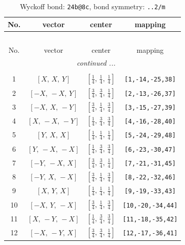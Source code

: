 \documentclass[fleqn,8pt]{jsarticle}
\begin{document}
\renewcommand{\arraystretch}{1.2}
\begin{longtable}{cccc}
\caption{Wyckoff bond: {\tt 24b@8c}, bond symmetry: {\tt ..2/m}}
 \\
 \hline \hline
No. & vector & center & mapping \\ \hline \endfirsthead

\multicolumn{3}{l}{\tablename\ \thetable{}} \\
 \hline \hline
No. & vector & center & mapping \\ \hline \endhead

 \hline \hline
\multicolumn{3}{r}{\footnotesize\it continued ...} \\ \endfoot

 \hline \hline
\multicolumn{3}{r}{} \\ \endlastfoot

1 & $\left[ X,\, X,\, Y \right]$ & $\left[ \frac{1}{4},\, \frac{1}{4},\, \frac{1}{4} \right]$ & {\tt [1,-14,-25,38]} \\ \hline
2 & $\left[ - X,\, - X,\, Y \right]$ & $\left[ \frac{3}{4},\, \frac{3}{4},\, \frac{1}{4} \right]$ & {\tt [2,-13,-26,37]} \\ \hline
3 & $\left[ - X,\, X,\, - Y \right]$ & $\left[ \frac{3}{4},\, \frac{1}{4},\, \frac{3}{4} \right]$ & {\tt [3,-15,-27,39]} \\ \hline
4 & $\left[ X,\, - X,\, - Y \right]$ & $\left[ \frac{1}{4},\, \frac{3}{4},\, \frac{3}{4} \right]$ & {\tt [4,-16,-28,40]} \\ \hline
5 & $\left[ Y,\, X,\, X \right]$ & $\left[ \frac{1}{4},\, \frac{1}{4},\, \frac{1}{4} \right]$ & {\tt [5,-24,-29,48]} \\ \hline
6 & $\left[ Y,\, - X,\, - X \right]$ & $\left[ \frac{1}{4},\, \frac{3}{4},\, \frac{3}{4} \right]$ & {\tt [6,-23,-30,47]} \\ \hline
7 & $\left[ - Y,\, - X,\, X \right]$ & $\left[ \frac{3}{4},\, \frac{3}{4},\, \frac{1}{4} \right]$ & {\tt [7,-21,-31,45]} \\ \hline
8 & $\left[ - Y,\, X,\, - X \right]$ & $\left[ \frac{3}{4},\, \frac{1}{4},\, \frac{3}{4} \right]$ & {\tt [8,-22,-32,46]} \\ \hline
9 & $\left[ X,\, Y,\, X \right]$ & $\left[ \frac{1}{4},\, \frac{1}{4},\, \frac{1}{4} \right]$ & {\tt [9,-19,-33,43]} \\ \hline
10 & $\left[ - X,\, Y,\, - X \right]$ & $\left[ \frac{3}{4},\, \frac{1}{4},\, \frac{3}{4} \right]$ & {\tt [10,-20,-34,44]} \\ \hline
11 & $\left[ X,\, - Y,\, - X \right]$ & $\left[ \frac{1}{4},\, \frac{3}{4},\, \frac{3}{4} \right]$ & {\tt [11,-18,-35,42]} \\ \hline
12 & $\left[ - X,\, - Y,\, X \right]$ & $\left[ \frac{3}{4},\, \frac{3}{4},\, \frac{1}{4} \right]$ & {\tt [12,-17,-36,41]} \\
\end{longtable}
\end{document}
